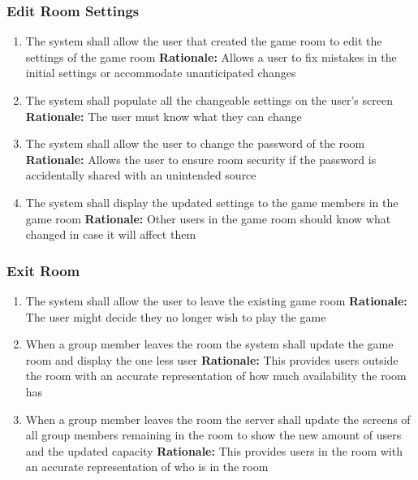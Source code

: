 \documentclass[12pt]{article}
\begin{document}
\subsubsection{Edit Room Settings}
\begin{enumerate}[label=RS\arabic*., series=EditRoom]
	\item The system shall allow the user that created the game room to edit the settings of the game room\newline 
    \textbf{Rationale:} Allows a user to fix mistakes in the initial settings or accommodate unanticipated changes
    \item The system shall populate all the changeable settings on the user's screen\newline 
    \textbf{Rationale:} The user must know what they can change
    \item The system shall allow the user to change the password of the room\newline 
    \textbf{Rationale:} Allows the user to ensure room security if the password is accidentally shared with an unintended source
    \item The system shall display the updated settings to the game members in the game room\newline 
    \textbf{Rationale:} Other users in the game room should know what changed in case it will affect them
\end{enumerate}

\subsubsection{Exit Room}
\begin{enumerate}[label=ER\arabic*., series=ExitRoom]
    \item The system shall allow the user to leave the existing game room\newline 
    \textbf{Rationale:} The user might decide they no longer wish to play the game
    \item When a group member leaves the room the system shall update the game room and display the one less user\newline 
    \textbf{Rationale:} This provides users outside the room with an accurate representation of how much availability the room has
    \item When a group member leaves the room the server shall update the screens of all group members remaining in the room to show the new amount of users and the updated capacity\newline 
    \textbf{Rationale:} This provides users in the room with an accurate representation of who is in the room
\end{enumerate}
\end{document}
